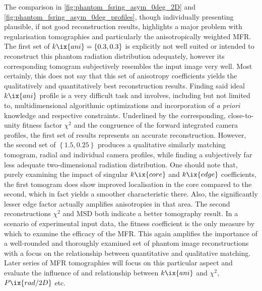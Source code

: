                 The comparison in \cref{fig:phantom_fsring_asym_0deg_2D} and \ref{fig:phantom_fsring_asym_0deg_profiles}, though individually presenting plausible, if not good reconstruction results, highlights a major problem with regularisation tomographies and particularly the anisotropically weighted MFR. The first set of $k\ix{ani}=\left\{0.3, 0.3\right\}$ is explicitly not well suited or intended to reconstruct this phantom radiation distribution adequately, however its corresponding tomogram subjectively resembles the input image very well. Most certainly, this does not say that this set of anisotropy coefficients yields the qualitatively and quantitatively best reconstruction results. Finding said ideal $k\ix{ani}$ profile is a very difficult task and involves, including but not limited to, multidimensional algorithmic optimizations and incorporation of \textit{a priori} knowledge and respective constraints. Underlined by the corresponding, close-to-unity fitness factor $\chi^{2}$ and the congruence of the forward integrated camera profiles, the first set of results represents an accurate reconstruction. However, the second set of $\left\{1.5, 0.25\right\}$ produces a qualitative similarly matching tomogram, radial and individual camera profiles, while finding a subjectively far less adequate two-dimensional radiation distribution. One should note that, purely examining the impact of singular $k\ix{core}$ and $k\ix{edge}$ coefficients, the first tomogram does show improved localisation in the core compared to the second, which in fact yields a smoother characteristic there. Also, the significantly lesser edge factor actually amplifies anisotropies in that area. The second reconstructions $\chi^{2}$ and MSD both indicate a better tomography result. In a scenario of experimental input data, the fitness coefficient is the only measure by which to examine the efficacy of the MFR. This again amplifies the importance of a well-rounded and thoroughly examined set of phantom image reconstructions with a focus on the relationship between quantitative and qualitative matching. Later series of MFR tomographies will focus on this particular aspect and evaluate the influence of and relationship between $k\ix{ani}$ and $\chi^{2}$, $P\ix{rad/2D}$ etc.%
%

